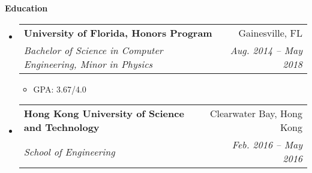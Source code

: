 \documentclass[letterpaper,11pt]{article}
\makeatletter
\newcommand{\resitem}[1]{\item #1 \vspace{-3pt}}
\newcommand{\resheading}[1]{{\large \colorbox{mygrey}{\begin{minipage}{\textwidth}{\textbf{#1 \vphantom{p\^{E}}}}\end{minipage}}}}
\newcommand{\ressubheading}[4]{
\begin{tabular*}{7.0in}{l@{\extracolsep{\fill}}r}
		\textbf{#1} & #2 \\
		\textit{#3} & \textit{#4} \\
\end{tabular*}\vspace{-6pt}}
\makeatother
\begin{document}
\resheading{Education}
    \begin{itemize}
    \item[]
        \ressubheading{University of Florida, Honors Program}{Gainesville, FL}{Bachelor of Science in Computer Engineering, Minor in Physics}{Aug. 2014 -- May 2018}
        \begin{itemize}
            \resitem{GPA: 3.67/4.0}
        \end{itemize}
    
    \item[]
        \ressubheading{Hong Kong University of Science and Technology}{Clearwater Bay, Hong Kong}{School of Engineering}{Feb. 2016 -- May 2016}
    \end{itemize}

\end{document}
